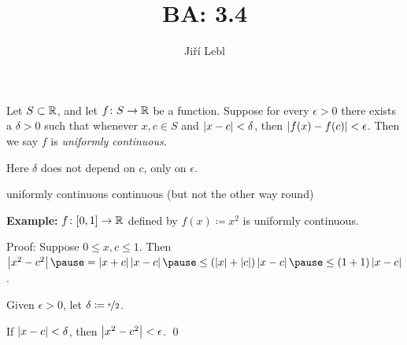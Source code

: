 \documentclass[10pt,aspectratio=149]{beamer}
\author{Ji\v{r}\'i Lebl}
\institute[OSU]{%
Departemento pri Matematiko de Oklahoma {\^S}tata Universitato}
\title{BA: 3.4}
\date{}
\begin{document}
\begin{frame}
\titlepage
\end{frame}

\begin{frame}
\begin{definition}
Let $S \subset {\mathbb{R}}$, and let $f \colon S \to {\mathbb{R}}$ be a function.
Suppose for every $\epsilon > 0$ there exists a $\delta > 0$
such that whenever $x, c \in S$ and
$\left\lvert {x-c} \right\rvert < \delta$, then $\left\lvert {f(x)-f(c)} \right\rvert < \epsilon$.
Then we say $f$ is \emph{uniformly continuous}.
\end{definition}

\pause
Here $\delta$ does not depend on $c$, only on $\epsilon$.

\pause
\medskip

uniformly continuous \wthus continuous \quad (but not the other way round)

\pause
\medskip

\textbf{Example:}
$f \colon [0,1] \to {\mathbb{R}}$ defined by $f(x) \coloneqq x^2$ is uniformly continuous.

\pause
\medskip

Proof: Suppose $0 \leq x,c \leq 1$.  Then
$\abs{x^2-c^2}
\pause
= \abs{x+c}\abs{x-c}
\pause
\leq (\abs{x}+\abs{c}) \abs{x-c}
\pause
\leq (1+1)\abs{x-c}$.

\pause
Given $\epsilon > 0$, let $\delta \coloneqq \nicefrac{\epsilon}{2}$.

\pause
If $\left\lvert {x-c} \right\rvert < \delta$, then $\left\lvert {x^2-c^2} \right\rvert < \epsilon$.
\qed

\end{frame}
\end{document}
